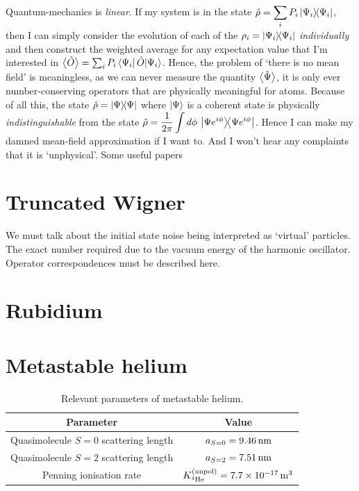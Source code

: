 Quantum-mechanics is \emph{linear}. If my system is in the state $\displaystyle \hat{\rho} = \sum_i P_i \left|\Psi_i\middle>\!\middle<\Psi_i\right|$, then I can simply consider the evolution of each of the $\displaystyle \rho_i = \left|\Psi_i\middle>\!\middle<\Psi_i\right|$ \emph{individually} and then construct the weighted average for any expectation value that I'm interested in ${\big<\hat{O}\big>} = \sum_i P_i \left<\Psi_i\right|\hat{O}{\left|\Psi_i\right>}$. Hence, the problem of `there is no mean field' is meaningless, as we can never measure the quantity ${\big<\hat{\Psi}\big>}$, it is only ever number-conserving operators that are physically meaningful for atoms. Because of all this, the state $\hat{\rho} = \left|\Psi\middle>\!\middle<\Psi\right|$ where ${\left|\Psi\right>}$ is a coherent state is physically \emph{indistinguishable} from the state $\displaystyle \hat{\rho} = \frac{1}{2\pi}\int d\phi\, \left|\Psi e^{i\phi}\middle>\!\middle<\Psi e^{i\phi}\right|$. Hence I can make my damned mean-field approximation if I want to. And I won't hear any complaints that it is `unphysical'. Some useful papers~\citep{Leggett:1991fj,Molmer:1997fr}

\section{Truncated Wigner}
\label{BackgroundTheory:TruncatedWigner}
We must talk about the initial state noise being interpreted as `virtual' particles. The exact number required due to the vacuum energy of the harmonic oscillator.
Operator correspondences must be described here.
\section{Rubidium}
\label{BackgroundTheory:Rubidium}
\section{Metastable helium}
\label{BackgroundTheory:Helium}

\begin{table}
    \centering
    \begin{tabular}{cc}
    \toprule
    Parameter & Value\\
    \midrule
    Quasimolecule $S=0$ scattering length & $a_{S=0}=\unit[9.46]{nm}$\\
    Quasimolecule $S=2$ scattering length & $a_{S=2}=\unit[7.51]{nm}$\\
    Penning ionisation rate & $\Kunpol = \unit[7.7\times 10^{-17}]{m\textsuperscript{3}}$\\
    \bottomrule
    \end{tabular}
    \caption{\label{BackgroundTheory:He*Parameters} Relevant parameters of metastable helium.}
\end{table}

